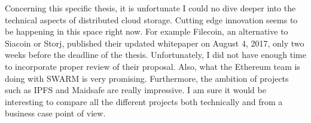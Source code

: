 Concerning this specific thesis, it is unfortunate I could no dive deeper into the technical aspects of distributed cloud storage. Cutting edge innovation seems to be happening in this space right now. For example Filecoin, an alternative to Siacoin or Storj, published their updated whitepaper on August 4, 2017, only two weeks before the deadline of the thesis. Unfortunately, I did not have enough time to incorporate proper review of their proposal. Also, what the Ethereum team is doing with SWARM is very promising. Furthermore, the ambition of projects such as IPFS and Maidsafe are really impressive. I am sure it would be interesting to compare all the different projects both technically and from a business case point of view. 